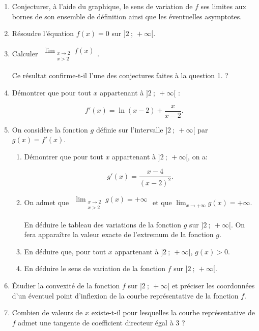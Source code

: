 \documentclass[10pt]{article}
\begin{document}
\begin{enumerate}
\item Conjecturer, à l'aide du graphique, le sens de variation de $f$ ses limites aux bornes
de son ensemble de définition ainsi que les éventuelles asymptotes.
\item Résoudre l'équation $f(x) = 0$ sur $]2~;~+\infty[$.
\item Calculer $\begin{gathered}\displaystyle\lim_{\substack{x \to 2\\x > 2}} f(x)\end{gathered}$.

Ce résultat confirme-t-il l'une des conjectures faites à la question 1. ?
\item Démontrer que pour tout $x$ appartenant à $]2~;~+\infty[$ :

\[f'(x) = \ln (x - 2) + \dfrac{x}{x - 2}.\]
\item On considère la fonction $g$ définie sur l'intervalle $]2~;~+\infty[$ par $g(x) = f'(x)$.
	\begin{enumerate}
		\item Démontrer que pour tout $x$ appartenant à $]2~;~+\infty[$, on a:

\[g'(x) = \dfrac{x - 4}{(x - 2)^2}.\]

		\item On admet que $\begin{gathered}\displaystyle\lim_{\substack{x \to 2\\x>2}} g(x) = + \infty\end{gathered}$ et que $\displaystyle\lim_{x \to + \infty} g(x) = +\infty$.

En déduire le tableau des variations de la fonction $g$ sur $]2~;~+\infty[$. On fera apparaître la valeur exacte de l'extremum de la fonction $g$.
		\item En déduire que, pour tout $x$ appartenant à $]2~;~+\infty[$,\: $g(x) > 0$.
		\item En déduire le sens de variation de la fonction $f$ sur $]2~;~+\infty[$.
	\end{enumerate}
\item Étudier la convexité de la fonction $f$ sur $]2~;~+\infty[$ et préciser les coordonnées d'un éventuel point d'inflexion de la courbe représentative de la fonction $f$.
\item Combien de valeurs de $x$ existe-t-il pour lesquelles la courbe représentative de $f$
admet une tangente de coefficient directeur égal à $3$ ?
\end{enumerate}

\bigskip
\end{document}
